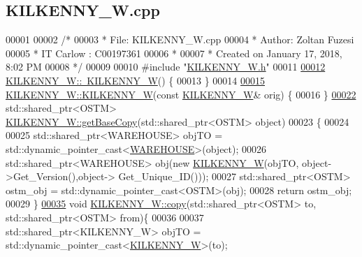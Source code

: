 \hypertarget{_k_i_l_k_e_n_n_y___w_8cpp_source}{}\subsection{K\+I\+L\+K\+E\+N\+N\+Y\+\_\+\+W.\+cpp}

\begin{DoxyCode}
00001 
00002 \textcolor{comment}{/* }
00003 \textcolor{comment}{ * File:   KILKENNY\_W.cpp}
00004 \textcolor{comment}{ * Author: Zoltan Fuzesi}
00005 \textcolor{comment}{ * IT Carlow : C00197361}
00006 \textcolor{comment}{ *}
00007 \textcolor{comment}{ * Created on January 17, 2018, 8:02 PM}
00008 \textcolor{comment}{ */}
00009 
00010 \textcolor{preprocessor}{#include "\hyperlink{_k_i_l_k_e_n_n_y___w_8h}{KILKENNY\_W.h}"}
00011 
\hypertarget{_k_i_l_k_e_n_n_y___w_8cpp_source.tex_l00012}{}\hyperlink{class_k_i_l_k_e_n_n_y___w_a5b3f84f505c05449d9a7235f25ff3694}{00012} \hyperlink{class_k_i_l_k_e_n_n_y___w_a5b3f84f505c05449d9a7235f25ff3694}{KILKENNY\_W::~KILKENNY\_W}() \{
00013 \}
00014 
\hypertarget{_k_i_l_k_e_n_n_y___w_8cpp_source.tex_l00015}{}\hyperlink{class_k_i_l_k_e_n_n_y___w_a370a1fb0d26d2b80da6e1101921d1564}{00015} \hyperlink{class_k_i_l_k_e_n_n_y___w_aee4c4b30bc934ff827f0851077b7fbab}{KILKENNY\_W::KILKENNY\_W}(\textcolor{keyword}{const} \hyperlink{class_k_i_l_k_e_n_n_y___w}{KILKENNY\_W}& orig) \{
00016 \}
\hypertarget{_k_i_l_k_e_n_n_y___w_8cpp_source.tex_l00022}{}\hyperlink{class_k_i_l_k_e_n_n_y___w_ad8c5f7f6ac7689fa9acd6cafb0cb69a4}{00022} std::shared\_ptr<OSTM> \hyperlink{class_k_i_l_k_e_n_n_y___w_ad8c5f7f6ac7689fa9acd6cafb0cb69a4}{KILKENNY\_W::getBaseCopy}(std::shared\_ptr<OSTM> \textcolor{keywordtype}{object})
00023 \{
00024 
00025     std::shared\_ptr<WAREHOUSE> objTO = std::dynamic\_pointer\_cast<\hyperlink{class_w_a_r_e_h_o_u_s_e}{WAREHOUSE}>(object);
00026     std::shared\_ptr<WAREHOUSE> obj(\textcolor{keyword}{new} \hyperlink{class_k_i_l_k_e_n_n_y___w_aee4c4b30bc934ff827f0851077b7fbab}{KILKENNY\_W}(objTO, object->Get\_Version(),\textcolor{keywordtype}{object}->
      Get\_Unique\_ID()));
00027     std::shared\_ptr<OSTM> ostm\_obj = std::dynamic\_pointer\_cast<OSTM>(obj);
00028     \textcolor{keywordflow}{return} ostm\_obj;
00029 \}
\hypertarget{_k_i_l_k_e_n_n_y___w_8cpp_source.tex_l00035}{}\hyperlink{class_k_i_l_k_e_n_n_y___w_a36a02e862f3563fbab3c94dfec4a0934}{00035} \textcolor{keywordtype}{void} \hyperlink{class_k_i_l_k_e_n_n_y___w_a36a02e862f3563fbab3c94dfec4a0934}{KILKENNY\_W::copy}(std::shared\_ptr<OSTM> to, std::shared\_ptr<OSTM> from)\{
00036 
00037     std::shared\_ptr<KILKENNY\_W> objTO = std::dynamic\_pointer\_cast<\hyperlink{class_k_i_l_k_e_n_n_y___w}{KILKENNY\_W}>(to);

\end{DoxyCode}
